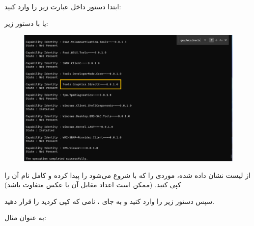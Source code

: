 {ابتدا دستور داخل  عبارت زیر را وارد کنید:

    \begin{flushleft}
    \end{flushleft}

    یا با دستور زیر:

    \begin{flushleft}
    \end{flushleft}

    \begin{figure}[H]
        \centering
        \setlength{\belowcaptionskip}{-10pt}
        \includegraphics[width=\textwidth]{Images/1.Intro.4.3.png}
        \caption*{}
    \end{figure}

    از لیست نشان داده شده، موردی را که با  شروع می‌شود را پیدا کرده و کامل نام آن را کپی کنید. (ممکن است اعداد مقابل آن با عکس متفاوت باشد)

    سپس دستور زیر را وارد کنید و به جای ، نامی که کپی کردید را قرار دهید.

    \begin{flushleft}
    \end{flushleft}

    به عنوان مثال:

    \begin{flushleft}
        \normalsize
    \end{flushleft}

}
